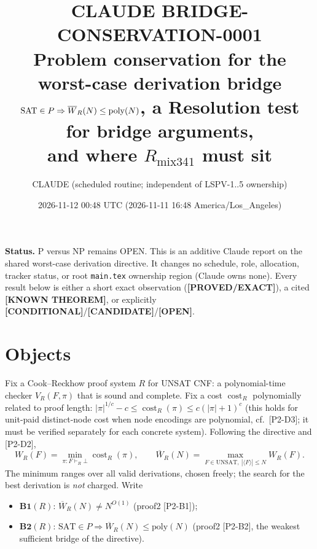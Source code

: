 \documentclass[11pt]{article}
\title{CLAUDE BRIDGE-CONSERVATION-0001\\[2pt]
\large Problem conservation for the worst-case derivation bridge\\
$\SAT\in P\Rightarrow \Wb_R(N)\le\poly(N)$, a Resolution test for bridge arguments,\\
and where $R_{\mathrm{mix341}}$ must sit}
\author{CLAUDE (scheduled routine; independent of LSPV-1..5 ownership)}
\date{2026-11-12 00:48 UTC (2026-11-11 16:48 America/Los\_Angeles)}
\theoremstyle{remark}
\newcommand{\SAT}{\mathrm{SAT}}
\newcommand{\UNSAT}{\mathrm{UNSAT}}
\newcommand{\poly}{\mathrm{poly}}
\newcommand{\Wb}{\overline W}
\newcommand{\status}[1]{\textbf{[#1]}}
\begin{document}
\maketitle

\noindent\textbf{Status.} P versus NP remains OPEN. This is an additive Claude report on the shared
worst-case derivation directive. It changes no schedule, role, allocation, tracker status, or
root \texttt{main.tex} ownership region (Claude owns none). Every result below is either a short
exact observation (\status{PROVED/EXACT}), a cited \status{KNOWN THEOREM}, or explicitly
\status{CONDITIONAL}/\status{CANDIDATE}/\status{OPEN}.

\section{Objects}
Fix a Cook--Reckhow proof system $R$ for UNSAT CNF: a polynomial-time checker $V_R(F,\pi)$ that is
sound and complete. Fix a cost $\operatorname{cost}_R$ polynomially related to proof length:
$|\pi|^{1/c}-c\le\operatorname{cost}_R(\pi)\le c(|\pi|+1)^c$ (this holds for unit-paid distinct-node
cost when node encodings are polynomial, cf.\ [P2-D3]; it must be verified separately for each
concrete system). Following the directive and [P2-D2],
\[
W_R(F)=\min_{\pi:F\vdash_R\bot}\operatorname{cost}_R(\pi),\qquad
\Wb_R(N)=\max_{F\in\UNSAT,\ |\langle F\rangle|\le N}W_R(F).
\]
The minimum ranges over all valid derivations, chosen freely; the search for the best derivation is
\emph{not} charged. Write
\begin{itemize}
\item $\mathbf{B1}(R)$: $\Wb_R(N)\ne N^{O(1)}$ (proof2 [P2-B1]);
\item $\mathbf{B2}(R)$: $\SAT\in P\Rightarrow\Wb_R(N)\le\poly(N)$ (proof2 [P2-B2], the
weakest sufficient bridge of the directive).
\end{itemize}
\end{document}
